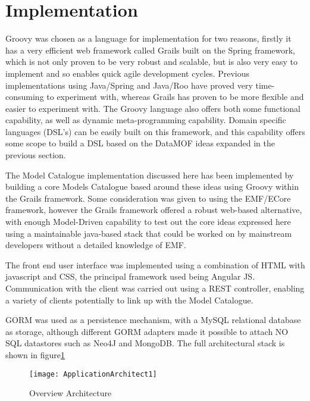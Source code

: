 \section{Implementation}

Groovy was chosen as a language for implementation for two reasons, firstly it has a very efficient web framework called Grails built on the Spring framework, which is not only proven to be very robust and scalable, but is also very easy to implement and so enables quick agile development cycles. Previous implementations using Java/Spring and Java/Roo have proved very time-consuming to experiment with, whereas Grails has proven to be more flexible and easier to experiment with. The Groovy language also offers both some functional capability, as well as dynamic meta-programming capability. Domain specific languages (DSL’s) can be easily built on this framework, and this capability offers some scope to build a DSL based on the DataMOF ideas expanded in the previous section.
 
The Model Catalogue implementation discussed here has been implemented by building a core Models Catalogue based around these ideas using Groovy within the Grails framework. Some consideration was given to using the EMF/ECore framework, however the Grails framework offered a robust web-based alternative, with enough Model-Driven capability to test out the core ideas expressed here using a maintainable java-based stack that could be worked on by mainstream developers without a detailed knowledge of EMF. 

The front end user interface was implemented using a combination of HTML with javascript and CSS, the principal framework used being Angular JS. Communication with the client was carried out using a REST controller, enabling a variety of clients potentially to link up with the Model Catalogue.

GORM was used as a persistence mechanism, with a MySQL relational database as storage, although different GORM adapters made it possible to attach NO SQL datastores such as Neo4J and MongoDB. The full architectural stack is shown in figure\ref{fig:ApplicationArchitectMDR}


\begin{figure}[here]
	\texttt{[image: ApplicationArchitect1]}
	\caption{Overview Architecture} 
	\label{fig:ApplicationArchitectMDR}
\end{figure}



 
 